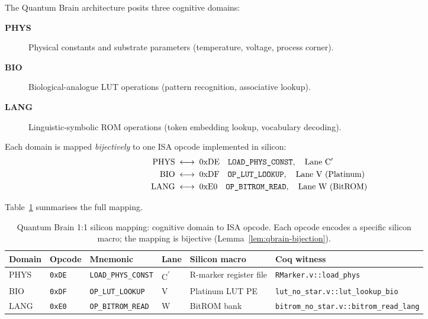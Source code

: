 The Quantum Brain architecture posits three cognitive domains:
%
\begin{description}
  \item[\textbf{PHYS}] Physical constants and substrate parameters
        (temperature, voltage, process corner).
  \item[\textbf{BIO}]  Biological-analogue LUT operations
        (pattern recognition, associative lookup).
  \item[\textbf{LANG}] Linguistic-symbolic ROM operations
        (token embedding lookup, vocabulary decoding).
\end{description}
%
Each domain is mapped \emph{bijectively} to one ISA opcode implemented in silicon:
%
\begin{align}
  \text{PHYS} &\;\longleftrightarrow\; 0\text{xDE} \quad \texttt{LOAD\_PHYS\_CONST},
  \quad \text{Lane C\textsuperscript{$\prime$}}
  \label{eq:phys-map}\\
  \text{BIO}  &\;\longleftrightarrow\; 0\text{xDF} \quad \texttt{OP\_LUT\_LOOKUP},
  \quad \text{Lane V (Platinum)}
  \label{eq:bio-map}\\
  \text{LANG} &\;\longleftrightarrow\; 0\text{xE0} \quad \texttt{OP\_BITROM\_READ},
  \quad \text{Lane W (BitROM)}
  \label{eq:lang-map}
\end{align}
%

Table~\ref{tab:qbrain-mapping} summarises the full mapping.

\begin{table}[ht]
  \centering
  \caption{Quantum Brain 1:1 silicon mapping: cognitive domain to ISA opcode.
           Each opcode encodes a specific silicon macro; the mapping is bijective
           (Lemma~\ref{lem:qbrain-bijection}).}
  \label{tab:qbrain-mapping}
  \begin{tabular}{llllll}
    \toprule
    \textbf{Domain} & \textbf{Opcode} & \textbf{Mnemonic} & \textbf{Lane} &
    \textbf{Silicon macro} & \textbf{Coq witness} \\
    \midrule
    PHYS & \texttt{0xDE} & \texttt{LOAD\_PHYS\_CONST} & C\textsuperscript{$\prime$} &
      R-marker register file & \texttt{RMarker.v::load\_phys} \\
    BIO  & \texttt{0xDF} & \texttt{OP\_LUT\_LOOKUP}   & V &
      Platinum LUT PE \cite{platinum_lut_pe_2026} & \texttt{lut\_no\_star.v::lut\_lookup\_bio} \\
    LANG & \texttt{0xE0} & \texttt{OP\_BITROM\_READ}  & W &
      BitROM bank \cite{bitrom_2025} & \texttt{bitrom\_no\_star.v::bitrom\_read\_lang} \\
    \bottomrule
  \end{tabular}
\end{table}

